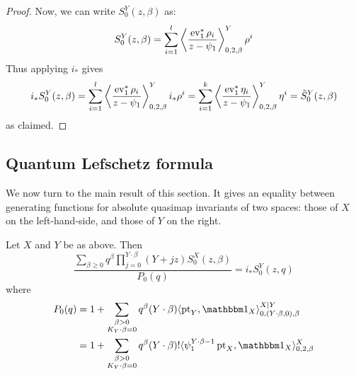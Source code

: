 \begin{proof}
\begin{comment}
where the last equality holds because $\gamma \in i^*\HH^*(X)^\perp$. So indeed $i_* \gamma = 0$ and so $i_* \rho_{k+1} = \ldots = i_* \rho_l = 0$. \end{comment}
Now, we can write $S_0^Y(z,\beta)$ as:
\begin{equation*} S_0^Y(z,\beta) = \sum_{i=1}^l \left\langle \dfrac{\operatorname{ev}_1^* \rho_i}{z-\psi_1} \right\rangle_{0,2,\beta}^Y  \rho^i \end{equation*}
Thus applying $i_*$ gives
\begin{align*} i_* S_0^Y(z,\beta)  = \sum_{i=1}^l \left\langle \dfrac{\operatorname{ev}_1^* \rho_i}{z-\psi_1} \right\rangle_{0,2,\beta}^Y   i_* \rho^i
= \sum_{i=1}^k \left\langle \dfrac{\operatorname{ev}_1^* \eta_i}{z-\psi_1} \right\rangle_{0,2,\beta}^Y   \eta^i = \tilde{S}_0^Y(z,\beta) \end{align*}
as claimed. \end{proof}


\subsection{Quantum Lefschetz formula} We now turn to the main result of this section. It gives an equality between generating functions for absolute quasimap invariants of two spaces: those of $X$ on the left-hand-side, and those of $Y$ on the right.
\begin{thm} \label{Theorem Quantum Lefschetz}
Let $X$ and $Y$ be as above. Then
\begin{equation}\label{eqn:mirror}
\dfrac{\sum_{\beta\geq 0} q^\beta\prod_{j=0}^{Y\cdot\beta}(Y+jz)S_0^X(z,\beta)}{P_0(q)}= i_*S_0^Y(z,q)
\end{equation}
where
\begin{align*}
 P_0(q) & = 1 + \sum_{\substack{\beta>0 \\ K_Y\cdot\beta=0}} q^\beta (Y\cdot\beta) \langle \pt_Y,\mathbbm 1_{X}\rangle_{0,(Y\cdot\beta,0),\beta}^{X|Y} \\
& = 1 + \sum_{\substack{\beta>0 \\ K_Y\cdot\beta=0}} q^\beta(Y\cdot\beta)!\langle\psi_1^{Y\cdot\beta-1} \pt_X,\mathbbm 1_{X}\rangle_{0,2,\beta}^X
\end{align*}
\end{thm}

